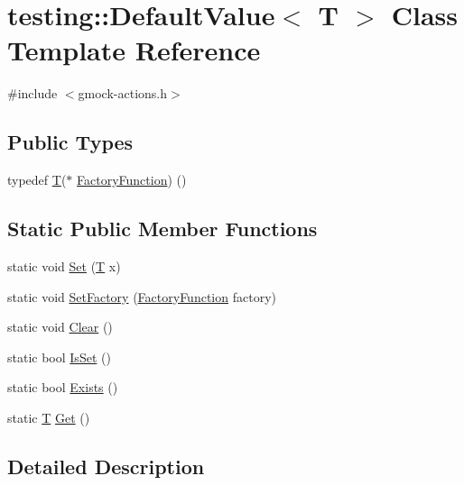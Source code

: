 \hypertarget{classtesting_1_1_default_value}{}\section{testing\+:\+:Default\+Value$<$ T $>$ Class Template Reference}
\label{classtesting_1_1_default_value}


{\ttfamily \#include $<$gmock-\/actions.\+h$>$}

\subsection*{Public Types}
\begin{DoxyCompactItemize}
\item 
typedef \hyperlink{functions__7_8js_adf1f3edb9115acb0a1e04209b7a9937b}{T}($\ast$ \hyperlink{classtesting_1_1_default_value_a5763a68d75e0a4c97fcaff708e2df803}{Factory\+Function}) ()
\end{DoxyCompactItemize}
\subsection*{Static Public Member Functions}
\begin{DoxyCompactItemize}
\item 
static void \hyperlink{classtesting_1_1_default_value_a5698814be364b9ac26e72ad37d6ff14e}{Set} (\hyperlink{functions__7_8js_adf1f3edb9115acb0a1e04209b7a9937b}{T} x)
\item 
static void \hyperlink{classtesting_1_1_default_value_af012445ff5b194940c1427529707cb91}{Set\+Factory} (\hyperlink{classtesting_1_1_default_value_a5763a68d75e0a4c97fcaff708e2df803}{Factory\+Function} factory)
\item 
static void \hyperlink{classtesting_1_1_default_value_a8163037b60311177cb211f070c512ee3}{Clear} ()
\item 
static bool \hyperlink{classtesting_1_1_default_value_ad49febe2c944cbbd06451ba7d0366ca1}{Is\+Set} ()
\item 
static bool \hyperlink{classtesting_1_1_default_value_aec1ff9b510af7dbb86c837fd2409fd70}{Exists} ()
\item 
static \hyperlink{functions__7_8js_adf1f3edb9115acb0a1e04209b7a9937b}{T} \hyperlink{classtesting_1_1_default_value_a4dc6dfee4cbc9cdb36f5c9cde5cf2b83}{Get} ()
\end{DoxyCompactItemize}


\subsection{Detailed Description}
